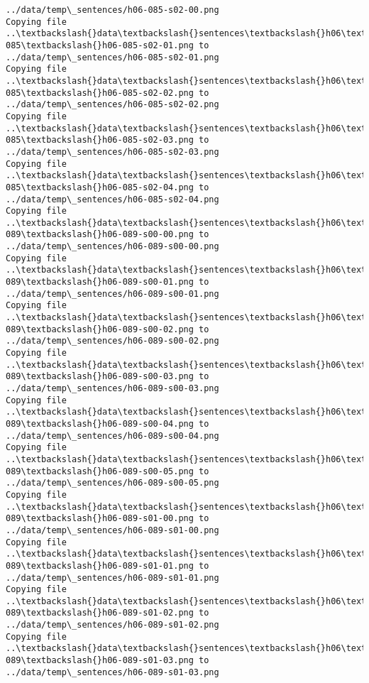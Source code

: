 \documentclass[11pt]{article}
\begin{document}
\begin{Verbatim}[commandchars=\\\{\}]
../data/temp\_sentences/h06-085-s02-00.png
Copying file ..\textbackslash{}data\textbackslash{}sentences\textbackslash{}h06\textbackslash{}h06-085\textbackslash{}h06-085-s02-01.png to
../data/temp\_sentences/h06-085-s02-01.png
Copying file ..\textbackslash{}data\textbackslash{}sentences\textbackslash{}h06\textbackslash{}h06-085\textbackslash{}h06-085-s02-02.png to
../data/temp\_sentences/h06-085-s02-02.png
Copying file ..\textbackslash{}data\textbackslash{}sentences\textbackslash{}h06\textbackslash{}h06-085\textbackslash{}h06-085-s02-03.png to
../data/temp\_sentences/h06-085-s02-03.png
Copying file ..\textbackslash{}data\textbackslash{}sentences\textbackslash{}h06\textbackslash{}h06-085\textbackslash{}h06-085-s02-04.png to
../data/temp\_sentences/h06-085-s02-04.png
Copying file ..\textbackslash{}data\textbackslash{}sentences\textbackslash{}h06\textbackslash{}h06-089\textbackslash{}h06-089-s00-00.png to
../data/temp\_sentences/h06-089-s00-00.png
Copying file ..\textbackslash{}data\textbackslash{}sentences\textbackslash{}h06\textbackslash{}h06-089\textbackslash{}h06-089-s00-01.png to
../data/temp\_sentences/h06-089-s00-01.png
Copying file ..\textbackslash{}data\textbackslash{}sentences\textbackslash{}h06\textbackslash{}h06-089\textbackslash{}h06-089-s00-02.png to
../data/temp\_sentences/h06-089-s00-02.png
Copying file ..\textbackslash{}data\textbackslash{}sentences\textbackslash{}h06\textbackslash{}h06-089\textbackslash{}h06-089-s00-03.png to
../data/temp\_sentences/h06-089-s00-03.png
Copying file ..\textbackslash{}data\textbackslash{}sentences\textbackslash{}h06\textbackslash{}h06-089\textbackslash{}h06-089-s00-04.png to
../data/temp\_sentences/h06-089-s00-04.png
Copying file ..\textbackslash{}data\textbackslash{}sentences\textbackslash{}h06\textbackslash{}h06-089\textbackslash{}h06-089-s00-05.png to
../data/temp\_sentences/h06-089-s00-05.png
Copying file ..\textbackslash{}data\textbackslash{}sentences\textbackslash{}h06\textbackslash{}h06-089\textbackslash{}h06-089-s01-00.png to
../data/temp\_sentences/h06-089-s01-00.png
Copying file ..\textbackslash{}data\textbackslash{}sentences\textbackslash{}h06\textbackslash{}h06-089\textbackslash{}h06-089-s01-01.png to
../data/temp\_sentences/h06-089-s01-01.png
Copying file ..\textbackslash{}data\textbackslash{}sentences\textbackslash{}h06\textbackslash{}h06-089\textbackslash{}h06-089-s01-02.png to
../data/temp\_sentences/h06-089-s01-02.png
Copying file ..\textbackslash{}data\textbackslash{}sentences\textbackslash{}h06\textbackslash{}h06-089\textbackslash{}h06-089-s01-03.png to
../data/temp\_sentences/h06-089-s01-03.png

\end{Verbatim}
\end{document}
